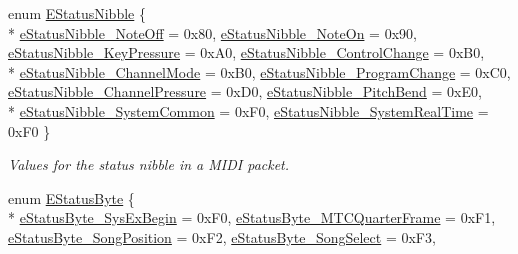\begin{DoxyCompactItemize}
\item 
enum \hyperlink{a00288_a128e460fdb72f04a5d077f77c02b3c30}{E\+Status\+Nibble} \{ \\*
\hyperlink{a00288_a128e460fdb72f04a5d077f77c02b3c30a879656d38da19be8e39951bb7037fdf6}{e\+Status\+Nibble\+\_\+\+Note\+Off} = 0x80, 
\hyperlink{a00288_a128e460fdb72f04a5d077f77c02b3c30ab269085f7106b0ba07ffaab0b7e6a713}{e\+Status\+Nibble\+\_\+\+Note\+On} = 0x90, 
\hyperlink{a00288_a128e460fdb72f04a5d077f77c02b3c30ac58c4a1d24d65b2aa83dd8958ab5c79f}{e\+Status\+Nibble\+\_\+\+Key\+Pressure} = 0x\+A0, 
\hyperlink{a00288_a128e460fdb72f04a5d077f77c02b3c30aad9f788bf727d8a2e29ed267f0c63c54}{e\+Status\+Nibble\+\_\+\+Control\+Change} = 0x\+B0, 
\\*
\hyperlink{a00288_a128e460fdb72f04a5d077f77c02b3c30acfa2f6c1f419ab8f84b18305cd182c05}{e\+Status\+Nibble\+\_\+\+Channel\+Mode} = 0x\+B0, 
\hyperlink{a00288_a128e460fdb72f04a5d077f77c02b3c30af1211ef53c1f40ee06aff0a624b42d2f}{e\+Status\+Nibble\+\_\+\+Program\+Change} = 0x\+C0, 
\hyperlink{a00288_a128e460fdb72f04a5d077f77c02b3c30a2f3c65a49b997078c50d7210a775f06c}{e\+Status\+Nibble\+\_\+\+Channel\+Pressure} = 0x\+D0, 
\hyperlink{a00288_a128e460fdb72f04a5d077f77c02b3c30a508ff1dbd19ad390f85611922fc81433}{e\+Status\+Nibble\+\_\+\+Pitch\+Bend} = 0x\+E0, 
\\*
\hyperlink{a00288_a128e460fdb72f04a5d077f77c02b3c30a046a282d622e11711878fcad5b713c8d}{e\+Status\+Nibble\+\_\+\+System\+Common} = 0x\+F0, 
\hyperlink{a00288_a128e460fdb72f04a5d077f77c02b3c30ab036cdb470fde61d5a397be9a1b036a5}{e\+Status\+Nibble\+\_\+\+System\+Real\+Time} = 0x\+F0
 \}
\begin{DoxyCompactList}\small\item\em Values for the status nibble in a M\+I\+D\+I packet. \end{DoxyCompactList}\item 
enum \hyperlink{a00288_a007db6cfa461dbbb87e49e2ec52e18b0}{E\+Status\+Byte} \{ \\*
\hyperlink{a00288_a007db6cfa461dbbb87e49e2ec52e18b0afe46f6c375435e0cddbcb9efda89b9ca}{e\+Status\+Byte\+\_\+\+Sys\+Ex\+Begin} = 0x\+F0, 
\hyperlink{a00288_a007db6cfa461dbbb87e49e2ec52e18b0a05d918c77b03e9be5378d487d6ef56de}{e\+Status\+Byte\+\_\+\+M\+T\+C\+Quarter\+Frame} = 0x\+F1, 
\hyperlink{a00288_a007db6cfa461dbbb87e49e2ec52e18b0ae7680a77d66673ac2900d2dac14270a0}{e\+Status\+Byte\+\_\+\+Song\+Position} = 0x\+F2, 
\hyperlink{a00288_a007db6cfa461dbbb87e49e2ec52e18b0a50a0b1fcddf5b5e29ee71320edd520eb}{e\+Status\+Byte\+\_\+\+Song\+Select} = 0x\+F3, 

\end{DoxyCompactItemize}
